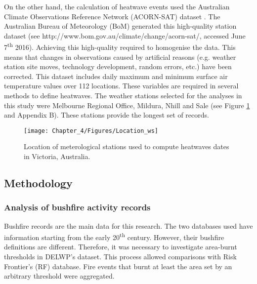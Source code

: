 On the other hand, the calculation of heatwave events used the Australian
Climate Observations Reference Network (ACORN-SAT) dataset \citep{Trewin2013}.
The Australian Bureau of Meteorology (BoM) generated this high-quality
station dataset (see http://www.bom.gov.au/climate/change/acorn-sat/,
accessed June 7\textsuperscript{th} 2016). Achieving this high-quality
required to homogenise the data. This means that changes in observations
caused by artificial reasons (e.g. weather station site moves, technology
development, random errors, etc.) have been corrected. This dataset
includes daily maximum and minimum surface air temperature values over 112
locations. These variables are required in several methods to define
heatwaves. The weather stations selected for the analyses in this
study were Melbourne Regional Office, Mildura, Nhill and Sale (see
Figure \ref{fig:Location of meterological stations used to compute heatwaves dates in Victoria, Australia}
and Appendix B). These stations provide the longest set of records. 

\begin{figure}[h]
\noindent \begin{centering}
\texttt{[image: Chapter\_4/Figures/Location\_ws]}
\par\end{centering}

\caption[Location of meterological stations used to compute heatwaves dates
in Victoria, Australia]{Location of meterological stations used to compute heatwaves dates
in Victoria, Australia. \label{fig:Location of meterological stations used to compute heatwaves dates in Victoria, Australia} }


\end{figure}



\subsection{Methodology}


\subsubsection{Analysis of bushfire activity records}

Bushfire records are the main data for this research. The two databases
used have information starting from the early 20\textsuperscript{th}
century. However, their bushfire definitions are different. Therefore,
it was necessary to investigate area-burnt thresholds in DELWP's dataset.
This process allowed comparisons with Risk Frontier's
(RF) database. Fire events that burnt at least the area set by an
arbitrary threshold were aggregated. 

